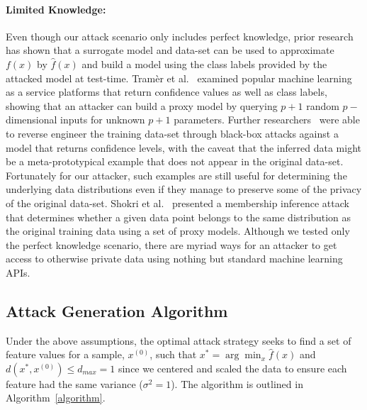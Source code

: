 \documentclass[fonts]{icst}
\begin{document}
\paragraph{Limited Knowledge: }
Even though our attack scenario only includes perfect knowledge, prior research~\cite{fredrikson2015model,biggio2013evasion,chakraborty2018adversarial,wang2019security,ateniese2015hacking} has shown that a surrogate model and data-set can be used to approximate $f(x)$ by $\hat{f}(x)$ and build a model using the class labels provided by the attacked model at test-time.
Tram\`er et al.~\cite{tramer2016stealing} examined popular machine learning as a service platforms that return confidence values as well as class labels, showing that an attacker can build a proxy model by querying $ p + 1$ random $p-$dimensional inputs for unknown $p+1$ parameters.
Further researchers~\cite{fredrikson2015model} were able to reverse engineer the training data-set through black-box attacks against a model that returns confidence levels, with the caveat that the inferred data might be a meta-prototypical example that does not appear in the original data-set.
Fortunately for our attacker, such examples are still useful for determining the underlying data distributions even if they manage to preserve some of the privacy of the original data-set.
Shokri et al.~\cite{shokri2017membership} presented a membership inference attack that determines whether a given data point belongs to the same distribution as the original training data using a set of proxy models.
Although we tested only the perfect knowledge scenario, there are myriad ways for an attacker to get access to otherwise private data using nothing but standard machine learning APIs.


\subsection{Attack Generation Algorithm}

Under the above assumptions, the optimal attack strategy seeks to find a set of feature values for a sample, $x^{(0)}$, such that
$x^* = \arg\min_{x}\hat{f}(x)$ and $d(x^*, x^{(0)}) \leq d_{max} = 1$ since we centered and scaled the data to ensure each feature had the same variance ($\sigma^2 = 1$).
The algorithm is outlined in Algorithm~\ref{algorithm}.
\end{document}
